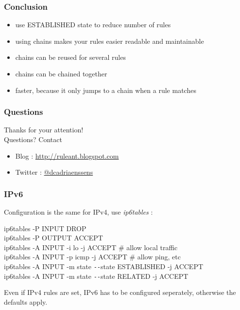 \documentclass[14pt]{beamer}
\newcommand{\dd}{{\texttt{-{}-}}}
\begin{document}
  \begin{frame}
    \frametitle{Conclusion}
    \begin{itemize}
      \item use ESTABLISHED state to reduce number of rules
      \item using chains makes your rules easier readable and maintainable
      \item chains can be reused for several rules
      \item chains can be chained together
      \item faster, because it only jumps to a chain when a rule matches
    \end{itemize}
  \end{frame}
  \begin{frame}
   \frametitle{Questions}
    Thanks for your attention!\\
    Questions?
    \vfill
    Contact
    \begin{itemize}
      \item Blog : \href{http://ruleant.blogspot.com/}{http://ruleant.blogspot.com}
      \item Twitter : \href{https://twitter.com/dcadriaenssens}{@dcadriaenssens}
    \end{itemize}
  \end{frame}
  \begin{frame}
    \frametitle{IPv6}
    Configuration is the same for IPv4, use \textit{ip6tables} :
    \begin{example}
      \small{ip6tables -P INPUT DROP\\
      ip6tables -P OUTPUT ACCEPT\\
      ip6tables -A INPUT -i lo -j ACCEPT \# allow local traffic\\
      ip6tables -A INPUT -p icmp -j ACCEPT \# allow ping, etc\\
      ip6tables -A INPUT -m state \dd state ESTABLISHED -j ACCEPT\\
      ip6tables -A INPUT -m state \dd state RELATED -j ACCEPT}
    \end{example}
    Even if IPv4 rules are set, IPv6 has to be configured seperately, otherwise the defaults apply.
  \end{frame}
\end{document}
